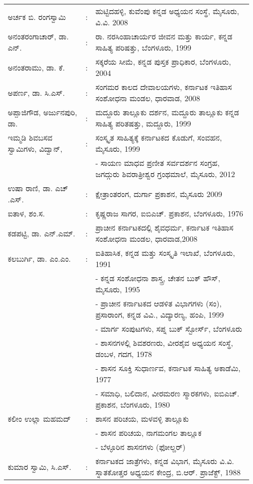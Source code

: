 \begin{longtable}[l]{@{}>{\raggedright}p{4.7cm}cp{9.2cm}<{\raggedright}@{}}
ಅರ್ಚಕ ಬಿ. ರಂಗಸ್ವಾಮಿ & : & ಹುಟ್ಟಿದಹಳ್ಳಿ, ಕುವೆಂಪು ಕನ್ನಡ ಅಧ್ಯಯನ ಸಂಸ್ಥೆ, ಮೈಸೂರು, ವಿ.ವಿ. 2008\\
ಅನಂತರಂಗಾಚಾರ್​, ಡಾ. ಎನ್​. & : & ರಾ. ನರಸಿಂಹಾಚಾರ್ಯರ ಜೀವನ ಮತ್ತು ಕಾರ್ಯ, ಕನ್ನಡ ಸಾಹಿತ್ಯ ಪರಿಷತ್ತು, ಬೆಂಗಳೂರು, 1999\\
ಅನಂತರಾಮು, ಡಾ. ಕೆ. & : & ಸಕ್ಕರೆಯ ಸೀಮೆ, ಕನ್ನಡ ಪುಸ್ತಕ ಪ್ರಾಧಿಕಾರ, ಬೆಂಗಳೂರು, 2004\\
ಅಪರ್ಣ, ಡಾ. ಸಿ.ಎಸ್​. & : & ಸಂಗಮರ ಕಾಲದ ದೇವಾಲಯಗಳು, ಕರ್ನಾಟಕ ಇತಿಹಾಸ ಸಂಶೋಧನಾ ಮಂಡಲ, ಧಾರವಾಡ, 2008\\
ಅಪ್ಪಾಜಿಗೌಡ, ಅರ್ಜುನಪುರಿ, ಡಾ. & : & ಮದ್ದೂರು ತಾಲ್ಲೂಕು ದರ್ಶನ, ಮದ್ದೂರು ತಾಲ್ಲೂಕು ಕನ್ನಡ ಸಾಹಿತ್ಯ ಪರಿತಷತ್ತು, ಮದ್ದೂರು, 1999\\
ಇಮ್ಮಡಿ ಶಿವಬಸವ ಸ್ವಾಮಿಗಳು, ವಿದ್ವಾನ್​, & : & ಸಂಸ್ಕೃತ ಸಾಹಿತ್ಯಕ್ಕೆ ಕರ್ನಾಟಕದ ಕೊಡುಗೆ, ಸಂವಹನ, ಮೈಸೂರು, 1999\\
 & & - ಸಾಯಣ ಮಾಧವ ಪ್ರಣೀತ ಸರ್ವದರ್ಶನ ಸಂಗ್ರಹ, ಜಗದ್ಗುರು ಶಿವರಾತ್ರೀಶ್ವರ ಗ್ರಂಥಮಾಲೆ, ಮೈಸೂರು, 2012\\
ಉಷಾ ರಾಣಿ, ಡಾ. ಎಚ್​.ಎಸ್​. & : & ಕ್ಷೇತ್ರಾಂತರಂಗ, ದುರ್ಗಾ ಪ್ರಕಾಶನ, ಮೈಸೂರು 2009\\
ಐತಾಳ, ಶಂ.ಸ. & : & ಕೃಷ್ಣರಾಜ ಸಾಗರ, ಐಬಿಎಚ್​. ಪ್ರಕಾಶನ, ಬೆಂಗಳೂರು, 1976\\
ಕಡಪಟ್ಟಿ, ಡಾ. ಎನ್​.ಎಮ್. & : & ಪ್ರಾಚೀನ ಕರ್ನಾಟಕದಲ್ಲಿ ಶೈವಧರ್ಮ, ಕರ್ನಾಟಕ ಇತಿಹಾಸ ಸಂಶೋಧನಾ ಮಂಡಲ, ಧಾರವಾಡ,2008\\
ಕಲಬುರ್ಗಿ, ಡಾ. ಎಂ.ಎಂ.  & : & ಐತಿಹಾಸಿಕ, ಕನ್ನಡ ಮತ್ತು ಸಂಸ್ಕೃತಿ ಇಲಾಖೆ, ಬೆಂಗಳೂರು, 1991\\
                 && - ಕನ್ನಡ ಸಂಶೋಧನಾ ಶಾಸ್ತ್ರ, ಚೇತನ ಬುಕ್​ ಹೌಸ್​, ಮೈಸೂರು, 1995\\
                 && - ಪ್ರಾಚೀನ ಕರ್ನಾಟಕದ ಆಡಳಿತ ವಿಭಾಗಗಳು (ಸಂ), ಪ್ರಸಾರಾಂಗ, ಕನ್ನಡ ವಿವಿ., ವಿದ್ಯಾರಣ್ಯ, ಹಂಪಿ, 1999\\
                 && - ಮಾರ್ಗ ಸಂಪುಟಗಳು, ಸಪ್ನ ಬುಕ್​ ಸ್ಟೋರ್ಸ್, ಬೆಂಗಳೂರು \\
                 && - ಶಾಸನಗಳಲ್ಲಿ ಶಿವಶರಣರು, ವೀರಶೈವ ಅಧ್ಯಯನ ಸಂಸ್ಥೆ, ಡಂಬಳ, ಗದಗ, 1978\\
                 && - ಶಾಸನ ಸೂಕ್ತಿ ಸುಧಾರ್ಣವ, ಕರ್ನಾಟಕ ಸಾಹಿತ್ಯ ಅಕಾಡೆಮಿ, 1977\\
                 && - ಸಮಾಧಿ, ಬಲಿದಾನ, ವೀರಮರಣ ಸ್ಮಾರಕಗಳು, ಐಬಿಎಚ್​. ಪ್ರಕಾಶನ, ಬೆಂಗಳೂರು, 1980\\
ಕಲೀಂ ಉಲ್ಲಾ ಮಹಮದ್ & ​: & ಶಾಸನ ಪರಿಚಯ, ಮಳವಳ್ಳಿ ತಾಲ್ಲೂಕು\\
&& - ಶಾಸನ ಪರಿಚಯ, ನಾಗಮಂಗಲ ತಾಲ್ಲೂಕ\\
&& - ಬೆಳ್ಳೂರಿನ ಶಾಸನಗಳು (ಫೋಲ್ಡರ್​)\\
ಕುಮಾರ ಸ್ವಾಮಿ, ಸಿ.ಎಸ್​. & : & ಕರ್ನಾಟಕದ ಜಾತ್ರೆಗಳು, ಕನ್ನಡ ವಿಭಾಗ, ಮೈಸೂರು ವಿ.ವಿ. ಸ್ನಾತಕೋತ್ತರ ಅಧ್ಯಯನ ಕೇಂದ್ರ, ಬಿ.ಆರ್​. ಪ್ರಾಜೆಕ್ಟ್​, 1988\\

\end{longtable}
